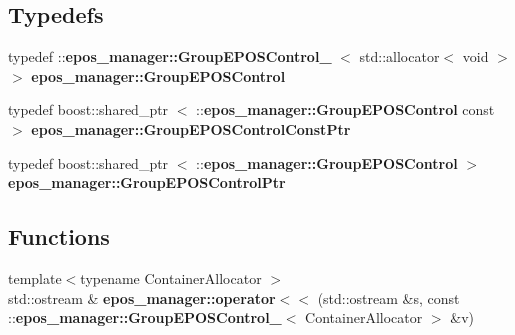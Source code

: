 \subsection*{\-Typedefs}
\begin{DoxyCompactItemize}
\item 
typedef \*
\-::{\bf epos\-\_\-manager\-::\-Group\-E\-P\-O\-S\-Control\-\_\-}\*
$<$ std\-::allocator$<$ void $>$ $>$ {\bf epos\-\_\-manager\-::\-Group\-E\-P\-O\-S\-Control}
\item 
typedef boost\-::shared\-\_\-ptr\*
$<$ \-::{\bf epos\-\_\-manager\-::\-Group\-E\-P\-O\-S\-Control} \*
const  $>$ {\bf epos\-\_\-manager\-::\-Group\-E\-P\-O\-S\-Control\-Const\-Ptr}
\item 
typedef boost\-::shared\-\_\-ptr\*
$<$ \-::{\bf epos\-\_\-manager\-::\-Group\-E\-P\-O\-S\-Control} $>$ {\bf epos\-\_\-manager\-::\-Group\-E\-P\-O\-S\-Control\-Ptr}
\end{DoxyCompactItemize}
\subsection*{\-Functions}
\begin{DoxyCompactItemize}
\item 
{\footnotesize template$<$typename Container\-Allocator $>$ }\\std\-::ostream \& {\bf epos\-\_\-manager\-::operator$<$$<$} (std\-::ostream \&s, const \-::{\bf epos\-\_\-manager\-::\-Group\-E\-P\-O\-S\-Control\-\_\-}$<$ \-Container\-Allocator $>$ \&v)
\end{DoxyCompactItemize}
